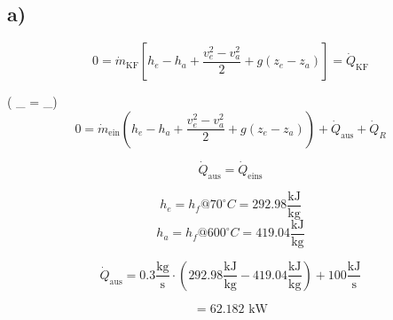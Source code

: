 

\subsection*{a)}

\[
0 = \dot{m}_{\text{KF}} \left[ h_e - h_a + \frac{v_e^2 - v_a^2}{2} + g (z_e - z_a) \right] = \dot{Q}_{\text{KF}}
\]

 \quad ( _{} = _{})
\[
0 = \dot{m}_{\text{ein}} \left( h_e - h_a + \frac{v_e^2 - v_a^2}{2} + g (z_e - z_a) \right) + \dot{Q}_{\text{aus}} + \dot{Q}_R
\]

\[
\dot{Q}_{\text{aus}} = \dot{Q}_{\text{eins}}
\]

\[
h_e = h_f @ 70^\circ C = 292.98 \frac{\text{kJ}}{\text{kg}}
\]
\[
h_a = h_f @ 600^\circ C = 419.04 \frac{\text{kJ}}{\text{kg}}
\]

\[
\dot{Q}_{\text{aus}} = 0.3 \frac{\text{kg}}{\text{s}} \cdot \left( 292.98 \frac{\text{kJ}}{\text{kg}} - 419.04 \frac{\text{kJ}}{\text{kg}} \right) + 100 \frac{\text{kJ}}{\text{s}}
\]

\[
= 62.182 \text{ kW}
\]